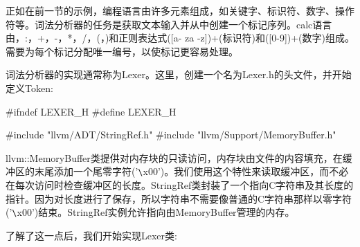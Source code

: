 正如在前一节的示例，编程语言由许多元素组成，如关键字、标识符、数字、操作符等。词法分析器的任务是获取文本输入并从中创建一个标记序列。calc语言由，:，+，-，*，/，(，)和正则表达式([a- za -z])+(标识符)和([0-9])+(数字)组成。需要为每个标记分配唯一编号，以使标记更容易处理。


词法分析器的实现通常称为Lexer。这里，创建一个名为Lexer.h的头文件，并开始定义Token:

\begin{cpp}
#ifndef LEXER_H
#define LEXER_H

#include "llvm/ADT/StringRef.h"
#include "llvm/Support/MemoryBuffer.h"
\end{cpp}

llvm::MemoryBuffer类提供对内存块的只读访问，内存块由文件的内容填充，在缓冲区的末尾添加一个尾零字符('\verb|\|x00')。我们使用这个特性来读取缓冲区，而不必在每次访问时检查缓冲区的长度。StringRef类封装了一个指向C字符串及其长度的指针。因为对长度进行了保存，所以字符串不需要像普通的C字符串那样以零字符('\verb|\|x00')结束。StringRef实例允许指向由MemoryBuffer管理的内存。

了解了这一点后，我们开始实现Lexer类:

